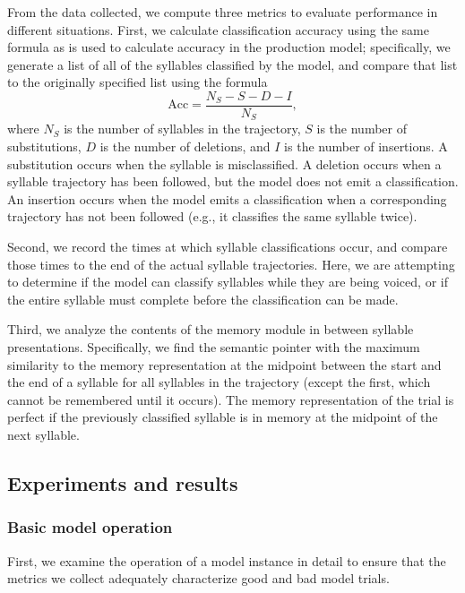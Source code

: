 From the data collected,
we compute three metrics
to evaluate performance
in different situations.
First, we calculate
classification accuracy
using the same formula
as is used to calculate
accuracy in the production model;
specifically,
we generate a list of all of the
syllables classified by the model,
and compare that list to the
originally specified list
using the formula
\begin{equation}
  \text{Acc} = \frac{N_S - S - D - I}{N_S},
\end{equation}
where $N_S$ is the number of syllables
in the trajectory,
$S$ is the number of substitutions,
$D$ is the number of deletions,
and $I$ is the number of insertions.
A substitution occurs when
the syllable is misclassified.
A deletion occurs when
a syllable trajectory has been followed,
but the model does not emit a classification.
An insertion occurs
when the model emits a classification
when a corresponding trajectory has not been followed
(e.g., it classifies the same syllable twice).

Second, we record the times at which
syllable classifications occur,
and compare those times
to the end of the actual syllable trajectories.
Here, we are attempting to determine
if the model can classify syllables
while they are being voiced,
or if the entire syllable must complete
before the classification can be made.

Third, we analyze the contents
of the memory module
in between syllable presentations.
Specifically,
we find the semantic pointer
with the maximum similarity
to the memory representation
at the midpoint between
the start and the end of a syllable
for all syllables in the trajectory
(except the first,
which cannot be remembered until it occurs).
The memory representation of the trial
is perfect if the
previously classified syllable
is in memory at the midpoint
of the next syllable.

\subsection{Experiments and results}

\subsubsection{Basic model operation}

First, we examine the operation
of a model instance in detail
to ensure that the metrics we collect
adequately characterize
good and bad model trials.

